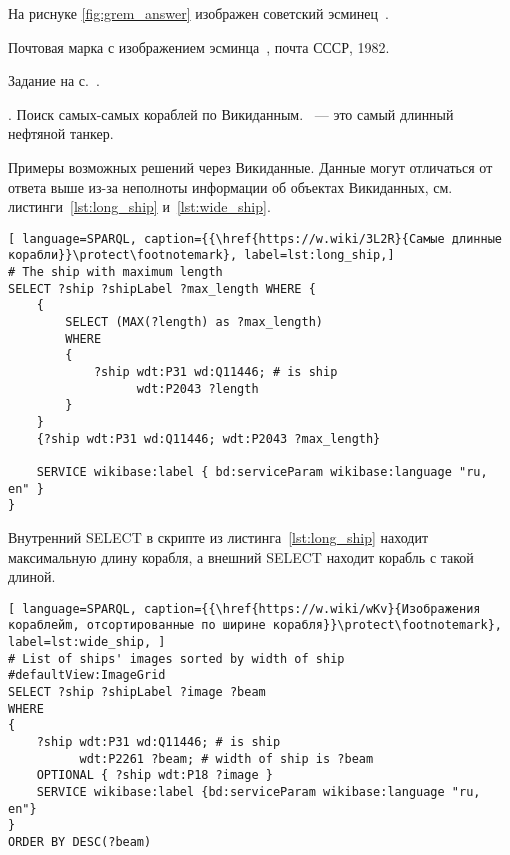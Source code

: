 \begin{task}
	На риснуке \ref{fig:grem_answer} изображен советский эсминец~.

	\label{answer:ship_2}
	\begin{marginfigure}[0.0cm]
		{
		  \setlength{\fboxsep}{0pt}%
		  \setlength{\fboxrule}{1pt}%
		}
		\caption{Почтовая марка с изображением эсминца~, почта СССР, 1982.}%
		\label{fig:grem_answer}%
	  \end{marginfigure}

    \small{Задание на с.~\pageref{question:ship_2}.}
\end{task}



\begin{task}
	\label{answer:ship_Guinness}
    . Поиск самых-самых кораблей по Викиданным.
    ~--- это самый длинный нефтяной танкер.

	Примеры возможных решений через Викиданные. Данные могут отличаться от ответа выше из-за неполноты информации об объектах Викиданных, см. листинги~\ref{lst:long_ship} и~\ref{lst:wide_ship}.
\begin{lstlisting}[ language=SPARQL, caption={{\href{https://w.wiki/3L2R}{Самые длинные корабли}}\protect\footnotemark}, label=lst:long_ship,]
# The ship with maximum length
SELECT ?ship ?shipLabel ?max_length WHERE {
	{
		SELECT (MAX(?length) as ?max_length)
		WHERE
		{
			?ship wdt:P31 wd:Q11446; # is ship
				  wdt:P2043 ?length
		}
	}
	{?ship wdt:P31 wd:Q11446; wdt:P2043 ?max_length}
		
	SERVICE wikibase:label { bd:serviceParam wikibase:language "ru, en" }
}  
\end{lstlisting}

Внутренний SELECT в скрипте из листинга~\ref{lst:long_ship} находит максимальную длину корабля, а внешний SELECT находит корабль с такой длиной.

\begin{lstlisting}[ language=SPARQL, caption={{\href{https://w.wiki/wKv}{Изображения кораблейm, отсортированные по ширине корабля}}\protect\footnotemark}, label=lst:wide_ship, ]
# List of ships' images sorted by width of ship
#defaultView:ImageGrid
SELECT ?ship ?shipLabel ?image ?beam
WHERE 
{
	?ship wdt:P31 wd:Q11446; # is ship
		  wdt:P2261 ?beam; # width of ship is ?beam
	OPTIONAL { ?ship wdt:P18 ?image }
	SERVICE wikibase:label {bd:serviceParam wikibase:language "ru, en"}
}
ORDER BY DESC(?beam)
\end{lstlisting}


\end{task}
